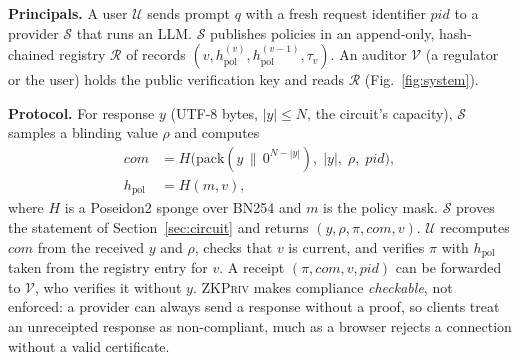 \documentclass[conference]{IEEEtran}
\newcommand{\sys}{\textsc{ZKPriv}}
\begin{document}
\textbf{Principals.} A user $\mathcal{U}$ sends prompt $q$ with a fresh request identifier $\mathit{pid}$ to a provider $\mathcal{S}$ that runs an LLM. $\mathcal{S}$ publishes policies in an append-only, hash-chained registry $\mathcal{R}$ of records $(v, h_{\mathrm{pol}}^{(v)}, h_{\mathrm{pol}}^{(v-1)}, \tau_v)$. An auditor $\mathcal{V}$ (a regulator or the user) holds the public verification key and reads $\mathcal{R}$ (Fig.~\ref{fig:system}).

\textbf{Protocol.} For response $y$ (UTF-8 bytes, $|y| \le N$, the circuit's capacity), $\mathcal{S}$ samples a blinding value $\rho$ and computes
\begin{equation}
\begin{aligned}
  \mathit{com} &= H\bigl(\mathrm{pack}(y\,\|\,0^{N-|y|}),\; |y|,\; \rho,\; \mathit{pid}\bigr),\\
  h_{\mathrm{pol}} &= H(m, v),
\end{aligned}
  \label{eq:com}
\end{equation}
where $H$ is a Poseidon2 sponge over BN254 and $m$ is the policy mask. $\mathcal{S}$ proves the statement of Section~\ref{sec:circuit} and returns $(y, \rho, \pi, \mathit{com}, v)$. $\mathcal{U}$ recomputes $\mathit{com}$ from the received $y$ and $\rho$, checks that $v$ is current, and verifies $\pi$ with $h_{\mathrm{pol}}$ taken from the registry entry for $v$. A receipt $(\pi, \mathit{com}, v, \mathit{pid})$ can be forwarded to $\mathcal{V}$, who verifies it without $y$. \sys{} makes compliance \emph{checkable}, not enforced: a provider can always send a response without a proof, so clients treat an unreceipted response as non-compliant, much as a browser rejects a connection without a valid certificate.
\end{document}
